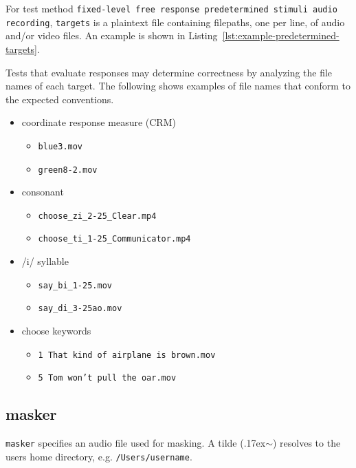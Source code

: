 \documentclass[11pt,pdftex,letterpaper]{article}
\newcommand{\mytilde}{\raise.17ex\hbox{$\scriptstyle\mathtt{\sim}$}}
\begin{document}
For test method \texttt{fixed-level free response predetermined stimuli audio recording}, \texttt{targets} is a plaintext file containing filepaths, one per line, of audio and/or video files. An example is shown in Listing~\ref{lst:example-predetermined-targets}.

\noindent\begin{minipage}{\textwidth}
	
\end{minipage}

Tests that evaluate responses may determine correctness by analyzing the file names of each target. The following shows examples of file names that conform to the expected conventions.
\begin{itemize}
	\item coordinate response measure (CRM)
	\begin{itemize}
		\item \texttt{blue3.mov}
		\item \texttt{green8-2.mov}
	\end{itemize}
	\item consonant
	\begin{itemize}
		\item \texttt{choose\_zi\_2-25\_Clear.mp4}
		\item \texttt{choose\_ti\_1-25\_Communicator.mp4}
	\end{itemize}
	\item /i/ syllable
	\begin{itemize}
		\item \texttt{say\_bi\_1-25.mov}
		\item \texttt{say\_di\_3-25ao.mov}
	\end{itemize}
	\item choose keywords
	\begin{itemize}
		\item \texttt{1 That kind of airplane is brown.mov}
		\item \texttt{5 Tom won't pull the oar.mov}
	\end{itemize}
\end{itemize}
\subsection{masker}
\texttt{masker} specifies an audio file used for masking. A tilde (\mytilde) resolves to the users home directory, e.g. \texttt{/Users/username}.
\end{document}
